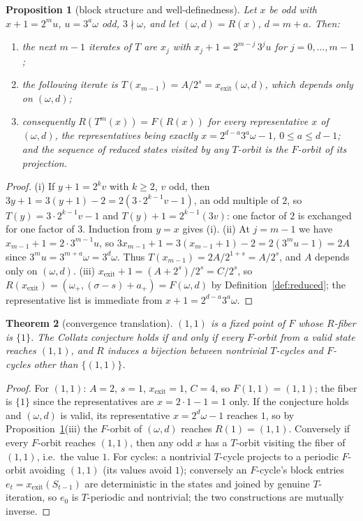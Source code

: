 \documentclass[11pt]{article}
\newtheorem{theorem}{Theorem}[section]
\newtheorem{proposition}[theorem]{Proposition}
\theoremstyle{remark}
\newcommand{\w}{\omega}
\newcommand{\wnext}{\w_{+}}
\begin{document}
\begin{proposition}[block structure and well-definedness]\label{prop:block}
Let $x$ be odd with $x + 1 = 2^m u$, $u = 3^a\w$ odd, $3 \nmid \w$, and let $(\w,d) = R(x)$, $d = m+a$. Then:
\begin{enumerate}
\item[(i)] the next $m - 1$ iterates of $T$ are $x_j$ with $x_j + 1 = 2^{m-j}\,3^j u$ for $j = 0,\dots,m-1$;
\item[(ii)] the following iterate is $T(x_{m-1}) = A/2^s = x_{\mathrm{exit}}(\w,d)$, which depends only on $(\w,d)$;
\item[(iii)] consequently $R(T^{m}(x)) = F(R(x))$ for every representative $x$ of $(\w,d)$, the representatives being exactly $x = 2^{d-a}3^a\w - 1$, $0 \le a \le d-1$; and the sequence of reduced states visited by any $T$-orbit is the $F$-orbit of its projection.
\end{enumerate}
\end{proposition}

\begin{proof}
(i) If $y + 1 = 2^k v$ with $k \ge 2$, $v$ odd, then $3y + 1 = 3(y+1) - 2 = 2\left(3\cdot 2^{k-1}v - 1\right)$, an odd multiple of $2$, so $T(y) = 3\cdot2^{k-1}v - 1$ and $T(y) + 1 = 2^{k-1}(3v)$: one factor of $2$ is exchanged for one factor of $3$. Induction from $y = x$ gives (i). (ii) At $j = m-1$ we have $x_{m-1} + 1 = 2\cdot 3^{m-1}u$, so $3x_{m-1} + 1 = 3(x_{m-1}+1) - 2 = 2(3^m u - 1) = 2A$ since $3^m u = 3^{m+a}\w = 3^d \w$. Thus $T(x_{m-1}) = 2A/2^{1+s} = A/2^s$, and $A$ depends only on $(\w,d)$. (iii) $x_{\mathrm{exit}} + 1 = (A + 2^s)/2^s = C/2^s$, so $R(x_{\mathrm{exit}}) = (\wnext, (\sigma - s) + a_+) = F(\w,d)$ by Definition~\ref{def:reduced}; the representative list is immediate from $x + 1 = 2^{d-a}3^a\w$.
\end{proof}

\begin{theorem}[convergence translation]\label{thm:equiv}
$(1,1)$ is a fixed point of $F$ whose $R$-fiber is $\{1\}$. The Collatz conjecture holds if and only if every $F$-orbit from a valid state reaches $(1,1)$, and $R$ induces a bijection between nontrivial $T$-cycles and $F$-cycles other than $\{(1,1)\}$.
\end{theorem}

\begin{proof}
For $(1,1)$: $A = 2$, $s = 1$, $x_{\mathrm{exit}} = 1$, $C = 4$, so $F(1,1) = (1,1)$; the fiber is $\{1\}$ since the representatives are $x = 2\cdot 1 - 1 = 1$ only. If the conjecture holds and $(\w,d)$ is valid, its representative $x = 2^d\w - 1$ reaches $1$, so by Proposition~\ref{prop:block}(iii) the $F$-orbit of $(\w,d)$ reaches $R(1) = (1,1)$. Conversely if every $F$-orbit reaches $(1,1)$, then any odd $x$ has a $T$-orbit visiting the fiber of $(1,1)$, i.e.\ the value $1$. For cycles: a nontrivial $T$-cycle projects to a periodic $F$-orbit avoiding $(1,1)$ (its values avoid $1$); conversely an $F$-cycle's block entries $e_t = x_{\mathrm{exit}}(S_{t-1})$ are deterministic in the states and joined by genuine $T$-iteration, so $e_0$ is $T$-periodic and nontrivial; the two constructions are mutually inverse.
\end{proof}
\end{document}
